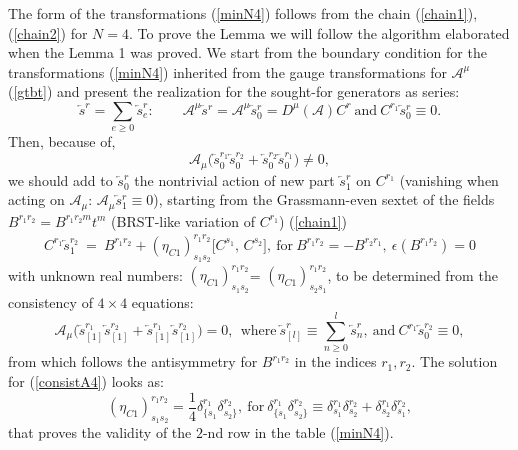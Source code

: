 \documentclass[10pt]{article}
\begin{document}
\vspace{1em}
The form of the transformations (\ref{minN4}) follows from the chain (\ref{chain1}), (\ref{chain2}) for $N=4$. To prove the Lemma we will follow the algorithm elaborated when the Lemma 1 was proved.
We start from the boundary condition for the  transformations (\ref{minN4}) inherited from the gauge transformations for $\mathcal{A}^\mu$ (\ref{gtbt}) and present the  realization for  the sought-for generators as series:
\begin{equation}\label{sersr}
\overleftarrow{s}^r = \sum_{e\geq 0}\overleftarrow{s}^r_e: \qquad  \mathcal{A}^\mu\overleftarrow{s}{}^{r} =  \mathcal{A}^\mu\overleftarrow{s}{}^{r}_0 = D^\mu(\mathcal{A})C^{r} \ \mathrm{and }\  C^{r_1}\overleftarrow{s}{}^{r}_0\equiv 0.
\end{equation}
Then, because of,
\begin{equation}\label{s0ne04}
\mathcal{A}_\mu\Big(\overleftarrow{s}{}_0^{r_1}\overleftarrow{s}{}_0^{r_2}
+\overleftarrow{s}{}^{r_2}_0\overleftarrow{s}{}^{r_1}_0\Big)  \ne 0,
\end{equation}
 we should add to
$\overleftarrow{s}{}_0^r$  the nontrivial action of new part  $\overleftarrow{s}{}^r_1$ on $C^{r_1}$ (vanishing when acting on $\mathcal{A}_\mu$: $\mathcal{A}_\mu\overleftarrow{s}{}^r_1 \equiv 0$),
starting from the Grassmann-even  sextet  of the fields $B^{r_1r_2}=B^{r_1r_2{}m}t^m$ (BRST-like variation of $C^{r_1}$) (\ref{chain1})
\begin{eqnarray}\label{4brstC}
  C^{r_1} \overleftarrow{s}{}^{r_2}_1 \ = \   B^{r_1r_2} + (\eta_{C1})^{r_1r_2}_{s_1s_2}  \big[C^{s_1},\,C^{s_2}\big]  ,   \ \mathrm{for}  \ B^{r_1r_2} = - B^{r_2r_1} , \ \epsilon(B^{r_1r_2})=0
\end{eqnarray}
with unknown real numbers: $ (\eta_{C1})^{r_1r_2}_{s_1s_2}$= $(\eta_{C1})_{s_2s_1}^{r_1r_2}$,
to be determined from the consistency of $4\times 4$ equations:
\begin{equation}\label{consistA4}
\mathcal{A}_{\mu}\Big(\overleftarrow{s}{}^{r_1}_{[1]}\overleftarrow{s}{}^{r_2}_{[1]}+\overleftarrow{s}{}^{r_1}_{[1]}\overleftarrow{s}{}^{r_2}_{[1]}\Big) =0 ,  \  \ \mathrm{where} \ \overleftarrow{s}^r_{[l]}\equiv \sum_{n\geq0}^l\overleftarrow{s}^r_{n}, \ \mathrm{and} \  C^{r_1} \overleftarrow{s}{}^{r_2}_0 \equiv 0,
\end{equation}
from which  follows the  antisymmetry for $B^{r_1r_2}$ in the indices $r_1,r_2$.
The solution for (\ref{consistA4})  looks as:
\begin{equation}\label{solconstA4}
 (\eta_{C1})_{s_1s_2}^{r_1r_2} = \frac{1}{4} \delta^{r_1}_{\{s_1}\delta^{r_2}_{s_2\}} , \ \mathrm{for} \  \delta^{r_1}_{\{s_1}\delta^{r_2}_{s_2\}}  \equiv \delta^{r_1}_{s_1}\delta^{r_2}_{s_2}+\delta^{r_1}_{s_2}\delta^{r_2}_{s_1},
\end{equation}
that proves  the validity of the $2$-nd row in the table (\ref{minN4}).
\end{document}
